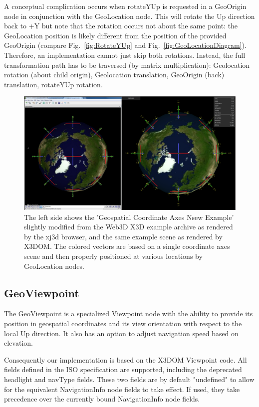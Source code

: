 \documentclass{acmsiggraph}                     %
\begin{document}
A conceptual complication occurs when rotateYUp is requested in a GeoOrigin node in conjunction with the GeoLocation node. This will rotate the Up direction back to +Y but note that the rotation occurs not about the same point: the GeoLocation position is likely different from the position of the provided GeoOrigin (compare Fig.~\ref{fig:RotateYUp} and Fig.~\ref{fig:GeoLocationDiagram}). Therefore, an implementation cannot just skip both rotations. Instead, the full transformation path has to be traversed (by matrix multiplication): Geolocation rotation (about child origin), Geolocation translation, GeoOrigin (back) translation, rotateYUp rotation.

\begin{figure}[htbp]
\centering
\includegraphics[width=6.6in]{Axes_NSEW.png}
\caption{The left side shows the 'Geospatial Coordinate Axes Nsew Example' slightly modified from the Web3D X3D example archive as rendered by the xj3d browser, and the same example scene as rendered by X3DOM. The colored vectors are based on a single coordinate axes scene and then properly positioned at various locations by GeoLocation nodes.}
\label{fig:Axes_NSEW.png}
\end{figure}

\subsection{GeoViewpoint}

The GeoViewpoint is a specialized Viewpoint node with the ability to provide its position in geospatial coordinates and its view orientation with respect to the local Up direction. It also has an option to adjust navigation speed based on elevation.

Consequently our implementation is based on the X3DOM Viewpoint code. All fields defined in the ISO specification are supported, including the deprecated headlight and navType fields. These two fields are by default "undefined" to allow for the equivalent NavigationInfo node fields to take effect. If used, they take precedence over the currently bound NavigationInfo node fields.
\end{document}
